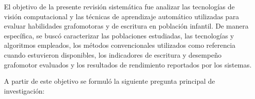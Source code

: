 \documentclass{iaesarticle}
\begin{document}
El objetivo de la presente revisión sistemática fue analizar las tecnologías de visión computacional y las técnicas de aprendizaje automático utilizadas para evaluar habilidades grafomotoras y de escritura en población infantil. De manera específica, se buscó caracterizar las poblaciones estudiadas, las tecnologías y algoritmos empleados, los métodos convencionales utilizados como referencia cuando estuvieron disponibles, los indicadores de escritura y desempeño grafomotor evaluados y los resultados de rendimiento reportados por los sistemas.

A partir de este objetivo se formuló la siguiente pregunta principal de investigación:

\begin{center}
\end{center}

\vspace{0.5em}
\end{document}
